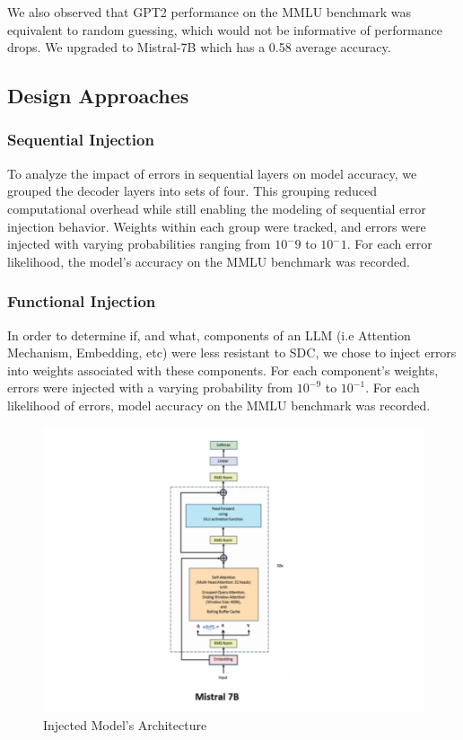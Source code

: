 We also observed that GPT2 performance on the MMLU benchmark was equivalent to random guessing, which would not be informative of performance drops. We upgraded to Mistral-7B which has a 0.58 average accuracy.

\subsection{Design Approaches}
\subsubsection{Sequential Injection} 
To analyze the impact of errors in sequential layers on model accuracy, we grouped the decoder layers into sets of four. This grouping reduced computational overhead while still enabling the modeling of sequential error injection behavior. Weights within each group were tracked, and errors were injected with varying probabilities ranging from $10^-9$ to $10^-1$. For each error likelihood, the model’s accuracy on the MMLU benchmark was recorded.

\subsubsection{Functional Injection} 
In order to determine if, and what, components of an LLM (i.e Attention Mechanism, Embedding, etc) were less resistant to SDC, we chose to inject errors into weights associated with these components. For each component's weights, errors were injected with a varying probability from $10^{-9}$ to $10^{-1}$. For each likelihood of errors, model accuracy on the MMLU benchmark was recorded.

\begin{figure}[!htbp]
    \centering
    \includegraphics[width=1\linewidth]{images/Mistral-7B-Arch.png}
    \caption{Injected Model's Architecture}
    \label{fig:enter-label}
\end{figure}